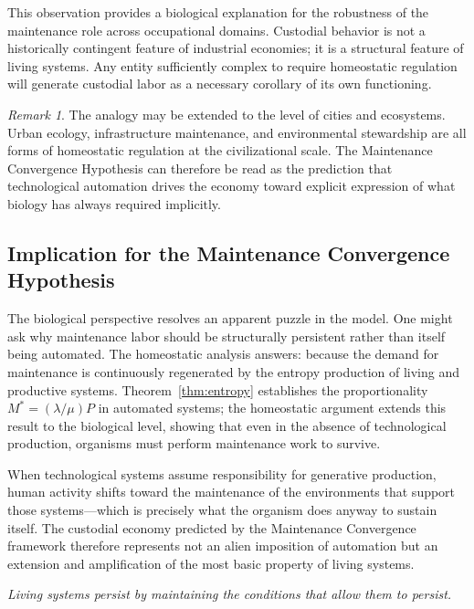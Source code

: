 \documentclass[12pt,a4paper]{article}
\theoremstyle{plain}
\theoremstyle{definition}
\theoremstyle{remark}
\newtheorem{remark}[theorem]{Remark}
\begin{document}
This observation provides a biological explanation for the robustness of
the maintenance role across occupational domains.  Custodial behavior is
not a historically contingent feature of industrial economies; it is a
structural feature of living systems.  Any entity sufficiently complex to
require homeostatic regulation will generate custodial labor as a necessary
corollary of its own functioning.

\begin{remark}
The analogy may be extended to the level of cities and ecosystems.  Urban
ecology, infrastructure maintenance, and environmental stewardship are all
forms of homeostatic regulation at the civilizational scale.  The Maintenance
Convergence Hypothesis can therefore be read as the prediction that
technological automation drives the economy toward explicit expression of
what biology has always required implicitly.
\end{remark}

\subsection{Implication for the Maintenance Convergence Hypothesis}

The biological perspective resolves an apparent puzzle in the model.  One
might ask why maintenance labor should be structurally persistent rather than
itself being automated.  The homeostatic analysis answers: because the
demand for maintenance is continuously regenerated by the entropy production
of living and productive systems.  Theorem~\ref{thm:entropy} establishes the
proportionality $M^* = (\lambda/\mu) P$ in automated systems; the
homeostatic argument extends this result to the biological level, showing that
even in the absence of technological production, organisms must perform
maintenance work to survive.

When technological systems assume responsibility for generative production,
human activity shifts toward the maintenance of the environments that support
those systems---which is precisely what the organism does anyway to sustain
itself.  The custodial economy predicted by the Maintenance Convergence
framework therefore represents not an alien imposition of automation but an
extension and amplification of the most basic property of living systems.

\bigskip
\begin{center}
\textit{Living systems persist by maintaining the conditions that allow them
to persist.}
\end{center}
\end{document}
